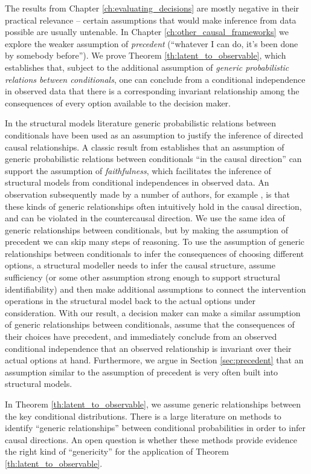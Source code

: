 The results from Chapter \ref{ch:evaluating_decisions} are mostly negative in their practical relevance -- certain assumptions that would make inference from data possible are usually untenable. In Chapter \ref{ch:other_causal_frameworks} we explore the weaker assumption of \emph{precedent} (``whatever I can do, it's been done by somebody before''). We prove Theorem \ref{th:latent_to_observable}, which establishes that, subject to the additional assumption of \emph{generic probabilistic relations between conditionals}, one can conclude from a conditional independence in observed data that there is a corresponding invariant relationship among the consequences of every option available to the decision maker. 

In the structural models literature generic probabilistic relations between conditionals have been used as an assumption to justify the inference of directed causal relationships. A classic result from \citet{meek_strong_1995} establishes that an assumption of generic probabilistic relations between conditionals ``in the causal direction'' can support the assumption of \emph{faithfulness}, which facilitates the inference of structural models from conditional independences in observed data. An observation subsequently made by a number of authors, for example \citet{lemeire_replacing_2013}, is that these kinds of generic relationships often intuitively hold in the causal direction, and can be violated in the countercausal direction. We use the same idea of generic relationships between conditionals, but by making the assumption of precedent we can skip many steps of reasoning. To use the assumption of generic relationships between conditionals to infer the consequences of choosing different options, a structural modeller needs to infer the causal structure, assume sufficiency (or some other assumption strong enough to support structural identifiability) and then make additional assumptions to connect the intervention operations in the structural model back to the actual options under consideration. With our result, a decision maker can make a similar assumption of generic relationships between conditionals, assume that the consequences of their choices have precedent, and immediately conclude from an observed conditional independence that an observed relationship is invariant over their actual options at hand. Furthermore, we argue in Section \ref{sec:precedent} that an assumption similar to the assumption of precedent is very often built into structural models.

In Theorem \ref{th:latent_to_observable}, we assume generic relationships between the key conditional distributions. There is a large literature on methods to identify ``generic relationships'' between conditional probabilities in order to infer causal directions. An open question is whether these methods provide evidence the right kind of ``genericity'' for the application of Theorem \ref{th:latent_to_observable}.

